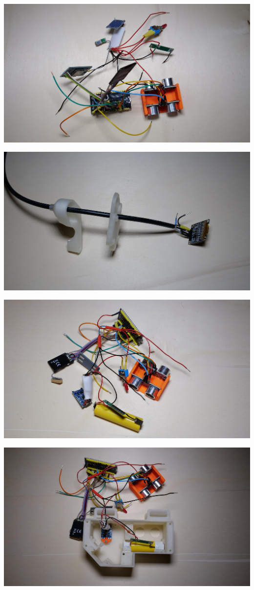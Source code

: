 \documentclass[
]{article}
\begin{document}
{\includegraphics{images/image19.jpg}}

{\includegraphics{images/image6.jpg}}

{\includegraphics{images/image21.jpg}}

{\includegraphics{images/image2.jpg}}
\end{document}
